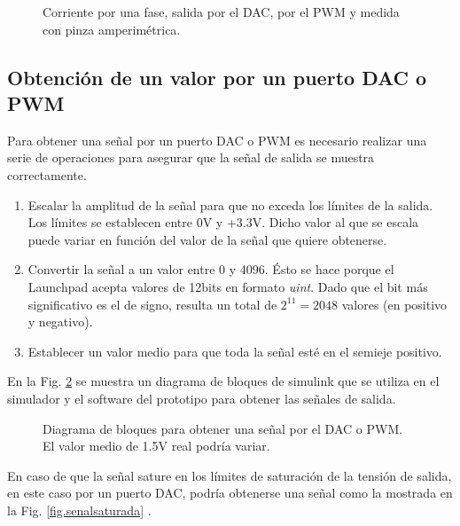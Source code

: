 \documentclass{report}
\begin{document}
\begin{figure}[!h]
    \begin{center}
    \resizebox{12cm}{!}{\texttt{[image: 20191218\_133221\_527]}}
    \caption{Corriente por una fase, salida por el DAC, por el PWM y medida con pinza amperimétrica.}
    \label{fig.20191218_133221_527} 
    \end{center}
\end{figure}

\clearpage
\subsection{Obtención de un valor por un puerto DAC o PWM} \label{sec.obtenervalorpordacpwm}

Para obtener una señal por un puerto DAC o PWM es necesario realizar una serie de operaciones para asegurar que la señal de salida se muestra correctamente.
\begin{enumerate}
    \item Escalar la amplitud de la señal para que no exceda los límites de la salida. Los límites se establecen entre 0V y +3.3V. Dicho valor al que se escala puede variar en función del valor de la señal que quiere obtenerse.
    \item Convertir la señal a un valor entre 0 y 4096. Ésto se hace porque el Launchpad acepta valores de 12bits en formato \textit{uint}. Dado que el bit más significativo es el de signo, resulta un total de $2^{11} = 2048$ valores (en positivo y negativo).
    \item Establecer un valor medio para que toda la señal esté en el semieje positivo.
\end{enumerate}

En la Fig. \ref{fig.obtenervalorpordacpwm} se muestra un diagrama de bloques de simulink que se utiliza en el simulador y el software del prototipo para obtener las señales de salida.


\begin{figure}[!h]
    \begin{center}
    \caption{Diagrama de bloques para obtener una señal por el DAC o PWM. El valor medio de 1.5V real podría variar.}
    \label{fig.obtenervalorpordacpwm} 
    \end{center}
\end{figure}

En caso de que la señal sature en los límites de saturación de la tensión de salida, en este caso por un puerto DAC, podría obtenerse una señal como la mostrada en la Fig. \ref{fig.senalsaturada} \cite{cincuentayseis}.
\end{document}
